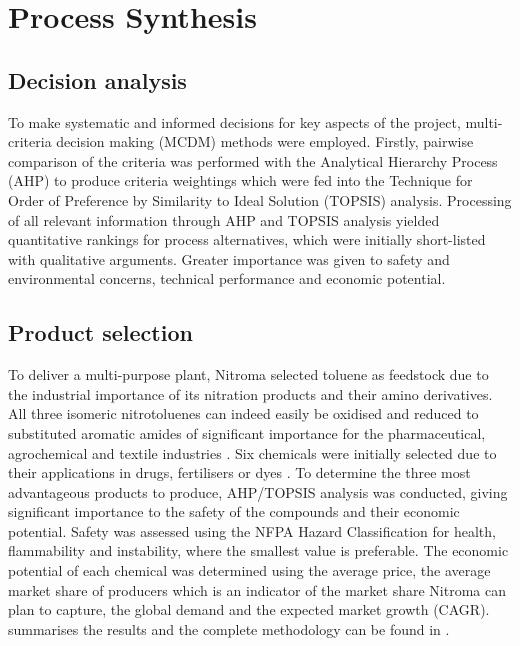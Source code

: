 \section{Process Synthesis }
\label{sec:synthesis}
\subsection{Decision analysis}
To make systematic and informed decisions for key aspects of the project, multi-criteria decision making (MCDM) methods were employed. Firstly, pairwise comparison of the criteria was performed with the Analytical Hierarchy Process (AHP) to produce criteria weightings which were fed into the Technique for Order of Preference by Similarity to Ideal Solution (TOPSIS) analysis. Processing of all relevant information through AHP and TOPSIS analysis yielded quantitative rankings for process alternatives, which were initially short-listed with qualitative arguments. Greater importance was given to safety and environmental concerns, technical performance and economic potential.


\subsection{Product selection}
To deliver a multi-purpose plant, Nitroma selected toluene as feedstock due to the industrial importance of its nitration products and their amino derivatives. All three isomeric nitrotoluenes can indeed easily be oxidised and reduced to substituted aromatic amides of significant importance for the pharmaceutical, agrochemical and textile industries \cite{dugal_nitrobenzene_2005}. Six chemicals were initially selected due to their applications in drugs, fertilisers or dyes \cite{bowers_toluidines_2000,bruhne_benzaldehyde_2011,maki_benzoic_2000}. To determine the three most advantageous products to produce, AHP/TOPSIS analysis was conducted, giving significant importance to the safety of the compounds and their economic potential. Safety was assessed using the NFPA Hazard Classification for health, flammability and instability, where the smallest value is preferable. The economic potential of each chemical was determined using the average price, the average market share of producers which is an indicator of the market share Nitroma can plan to capture, the global demand and the expected market growth (CAGR).  summarises the results and the complete methodology can be found in .   

